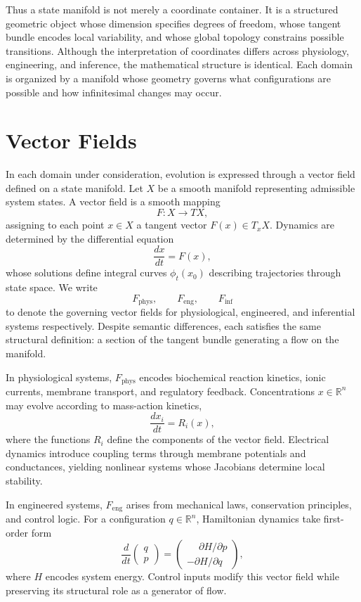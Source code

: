 \documentclass[12pt]{book}
\begin{document}
Thus a state manifold is not merely a coordinate container. It is a structured geometric object whose dimension specifies degrees of freedom, whose tangent bundle encodes local variability, and whose global topology constrains possible transitions. Although the interpretation of coordinates differs across physiology, engineering, and inference, the mathematical structure is identical. Each domain is organized by a manifold whose geometry governs what configurations are possible and how infinitesimal changes may occur.

\section{Vector Fields}

In each domain under consideration, evolution is expressed through a vector
field defined on a state manifold. Let $X$ be a smooth manifold representing
admissible system states. A vector field is a smooth mapping
\[
  F : X \to TX,
\]
assigning to each point $x \in X$ a tangent vector $F(x) \in T_x X$. Dynamics
are determined by the differential equation
\[
  \frac{dx}{dt} = F(x),
\]
whose solutions define integral curves $\phi_t(x_0)$ describing trajectories
through state space. We write
\[
  F_{\text{phys}}, \qquad F_{\text{eng}}, \qquad F_{\text{inf}}
\]
to denote the governing vector fields for physiological, engineered, and
inferential systems respectively. Despite semantic differences, each satisfies
the same structural definition: a section of the tangent bundle generating a
flow on the manifold.

In physiological systems, $F_{\text{phys}}$ encodes biochemical reaction
kinetics, ionic currents, membrane transport, and regulatory feedback.
Concentrations $x \in \mathbb{R}^n$ may evolve according to mass-action
kinetics,
\[
  \frac{dx_i}{dt} = R_i(x),
\]
where the functions $R_i$ define the components of the vector field. Electrical
dynamics introduce coupling terms through membrane potentials and conductances,
yielding nonlinear systems whose Jacobians determine local stability.

In engineered systems, $F_{\text{eng}}$ arises from mechanical laws,
conservation principles, and control logic. For a configuration $q \in
\mathbb{R}^n$, Hamiltonian dynamics take first-order form
\[
  \frac{d}{dt}
  \begin{pmatrix} q \\ p \end{pmatrix}
  =
  \begin{pmatrix} \phantom{-}\partial H / \partial p \\
                  -\partial H / \partial q \end{pmatrix},
\]
where $H$ encodes system energy. Control inputs modify this vector field while
preserving its structural role as a generator of flow.
\end{document}
